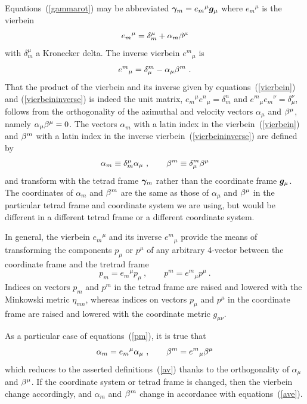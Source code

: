 \documentclass[twocolumn,showpacs,preprintnumbers,amsmath,amssymb,prb]{revtex4}
\begin{document}
Equations~(\ref{gammarot})
may be abbreviated
$\bm{\gamma}_m = {e_m}^\mu \bm{g}_\mu$
where ${e_m}^\mu$ is the vierbein
\begin{equation}
\label{vierbein}
  {e_m}^\mu = \delta_m^\mu + \alpha_m \beta^\mu
\end{equation}
with $\delta_m^\mu$ a Kronecker delta.
The inverse vierbein
${e^m}_\mu$
is
\begin{equation}
\label{vierbeininverse}
  {e^m}_\mu = \delta_\mu^m - \alpha_\mu \beta^m
  \ .
\end{equation}
That the product of the vierbein and its inverse
given by equations~(\ref{vierbein}) and (\ref{vierbeininverse})
is indeed the unit matrix,
${e_m}^\mu {e^n}_\mu = \delta_m^n$ and ${e^m}_\mu {e_m}^\nu = \delta_\mu^\nu$,
follows from
the orthogonality of the azimuthal and velocity vectors
$\alpha_\mu$ and $\beta^\mu$,
namely $\alpha_\mu \beta^\mu = 0$.
The vectors
$\alpha_m$ with a latin index in the vierbein~(\ref{vierbein})
and $\beta^m$ with a latin index in the inverse vierbein~(\ref{vierbeininverse})
are defined by
\begin{equation}
\label{av}
  \alpha_m \equiv \delta_m^\mu \alpha_\mu
  \ ,
  \qquad
  \beta^m \equiv \delta^m_\mu \beta^\mu
\end{equation}
and transform with the tetrad frame $\bm{\gamma}_m$
rather than the coordinate frame $\bm{g}_\mu$.
The coordinates of $\alpha_m$ and $\beta^m$ are the same as those of
$\alpha_\mu$ and $\beta^\mu$
in the particular tetrad frame and coordinate system we are using,
but would be different in a different tetrad frame
or a different coordinate system.

In general,
the vierbein ${e_m}^\mu$ and its inverse ${e^m}_\mu$
provide the means of transforming the components
$p_\mu$ or $p^\mu$
of any arbitrary 4-vector
between the coordinate frame and the tretrad frame
\begin{equation}
\label{pm}
  p_m = {e_m}^\mu p_\mu
  \ ,
  \qquad
  p^m = {e^m}_\mu p^\mu
  \ .
\end{equation}
Indices on vectors $p_m$ and $p^m$
in the tetrad frame
are raised and lowered with the Minkowski metric $\eta_{mn}$,
whereas
indices on vectors $p_\mu$ and $p^\mu$
in the coordinate frame
are raised and lowered with the coordinate metric $g_{\mu\nu}$.

As a particular case of equations~(\ref{pm}),
it is true that
\begin{equation}
\label{ave}
  \alpha_m = {e_m}^\mu \alpha_\mu
  \ ,
  \qquad
  \beta^m = {e^m}_\mu \beta^\mu
\end{equation}
which reduces to the asserted definitions~(\ref{av})
thanks to the orthogonality of $\alpha_\mu$ and $\beta^\mu$.
If the coordinate system or tetrad frame is changed,
then the vierbein change accordingly,
and $\alpha_m$ and $\beta^m$
change in accordance with equations~(\ref{ave}).
\end{document}
